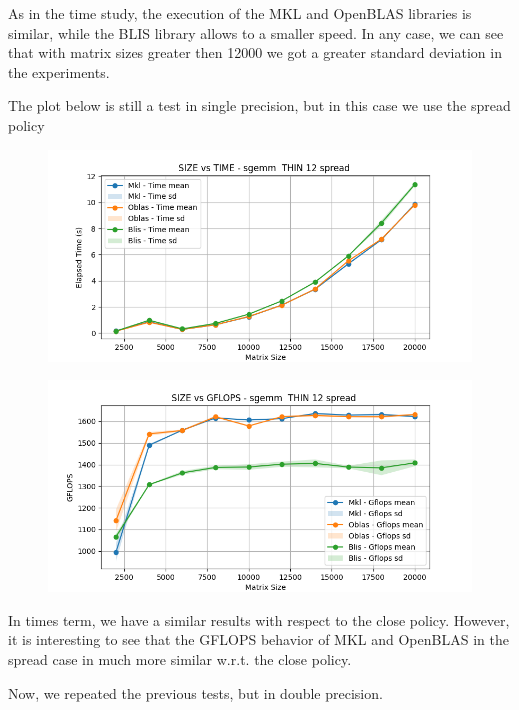 \documentclass[12pt, titlepage]{report}
\begin{document}
As in the time study, the execution of the MKL and OpenBLAS libraries is similar, while the BLIS library allows to a smaller speed. In any case, we can see that with matrix sizes greater then 12000 we got a greater standard deviation in the experiments. 

 The plot below is still a test in single precision, but in this case we use the spread policy
\begin{figure}[H]
    \centering
    \includegraphics[width=\textwidth]{THIN 12/sgemm__THIN_12_spread_time.png}
\end{figure}

\begin{figure}[H]
    \centering
    \includegraphics[width=\textwidth]{THIN 12/sgemm__THIN_12_spread_gflops.png}
\end{figure}

In times term, we have a similar results with respect to the close policy. However, it is interesting to see that the GFLOPS behavior of MKL and OpenBLAS in the spread case in much more similar w.r.t. the close policy.

Now, we repeated the previous tests, but in double precision.
\end{document}
